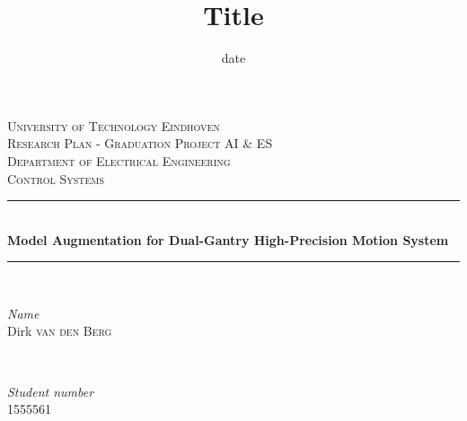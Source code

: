 \documentclass{article}
\title{Title}
\date{date}
\begin{document}


\begin{titlepage} %
	\newcommand{\HRule}{\rule{\linewidth}{0.5mm}} %
	
	\center %
	
	
	\textsc{\LARGE University of Technology Eindhoven}\\[1.5cm] %
	
	\textsc{\Large Research Plan - Graduation Project AI \& ES}\\[0.5cm] %
	
	\textsc{\large Department of Electrical Engineering}\\[0.5cm]
    
    \textsc{\large Control Systems}\\[0.5cm] %
	
	
	\HRule\\[0.4cm]
	
	{\huge\bfseries Model Augmentation for Dual-Gantry High-Precision Motion System}\\[0.4cm] %
	
	\HRule\\[1.5cm]
	
	
	\begin{minipage}{0.4\textwidth}
		\begin{flushleft}
			\large
			\textit{Name}\\ %
			Dirk  \textsc{van den Berg}\\
			
			
			
		\end{flushleft}
	\end{minipage}
	~
	\begin{minipage}{0.4\textwidth}
		\begin{flushright}
			\large
			\textit{Student number}\\
			1555561 \\
			

\end{flushright}
\end{minipage}
\end{titlepage}
\end{document}
